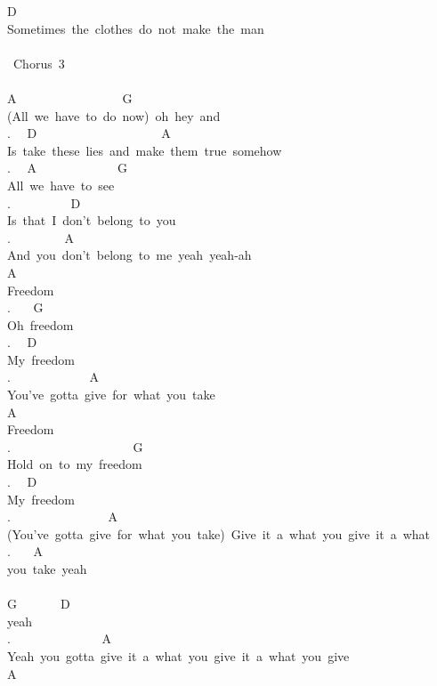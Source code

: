 {D\\
Sometimes\ the\ clothes\ do\ not\ make\ the\ man\ \\
\\
\lbrack\ Chorus\ 3\rbrack\\
\\
A\ \ \ \ \ \ \ \ \ \ \ \ \ \ \ \ \ G\\
(All\ we\ have\ to\ do\ now)\ oh\ hey\ and\\
. \ \ D\ \ \ \ \ \ \ \ \ \ \ \ \ \ \ \ \ \ \ \ A\\
Is\ take\ these\ lies\ and\ make\ them\ true\ somehow\\
. \ \ A\ \ \ \ \ \ \ \ \ \ \ \ \ G\\
All\ we\ have\ to\ see\\
. \ \ \ \ \ \ \ \ \ D\ \ \ \ \ \ \ \ \ \ \ \ \ \ \ \ \ \ \\
Is\ that\ I\ don't\ belong\ to\ you\\
. \ \ \ \ \ \ \ \ A\\
And\ you\ don't\ belong\ to\ me\ yeah\ yeah-ah\\
A\\
Freedom\ \\
. \ \ \ G\\
Oh\ freedom\ \\
. \ \ D\\
My\ freedom\ \\
. \ \ \ \ \ \ \ \ \ \ \ \ A\\
You've\ gotta\ give\ for\ what\ you\ take\\
A\\
Freedom\\
. \ \ \ \ \ \ \ \ \ \ \ \ \ \ \ \ \ \ \ G\\
Hold\ on\ to\ my\ freedom\ \\
. \ \ D\\
My\ freedom\ \\
. \ \ \ \ \ \ \ \ \ \ \ \ \ \ \ A\\
(You've\ gotta\ give\ for\ what\ you\ take)\ Give\ it\ a\ what\ you\ give\ it\ a\ what\ \\
. \ \ \ A\\
you\ take\ yeah\ \\
\\
G\ \ \ \ \ \ \ D\\
yeah\\
. \ \ \ \ \ \ \ \ \ \ \ \ \ \ A\\
Yeah\ you\ gotta\ give\ it\ a\ what\ you\ give\ it\ a\ what\ you\ give\\
A\\
}
